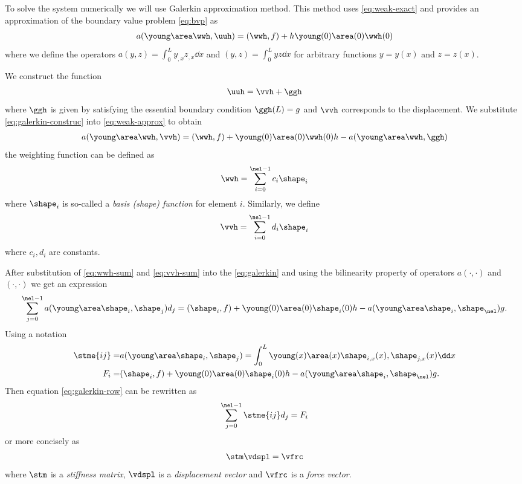 \documentclass[twoside,a4paper,12pt]{article}
\newcommand{\+}[2]{\newcommand#1{{\color{\notcolor}#2}}}
\newcommand{\1}[2]{\newcommand{#1}[1]{{\color{\notcolor}#2}}}
\newcommand{\2}[2]{\newcommand{#1}[2]{{\color{\notcolor}#2}}}
\begin{document}
To solve the system numerically we will use Galerkin approximation
method. This method uses \eqref{eq:weak-exact} and provides an
approximation of the boundary value problem \eqref{eq:bvp} as
%
\begin{align}
a(\young\area\wwh,\uuh) = (\wwh,f) + h \young(0)\area(0)\wwh(0) \label{eq:weak-approx}
\end{align}
%
where we define the operators $a(y,z) = \int_0^L y_{,x} z_{,x} \dd x$
and $(y,z) = \int_0^L y z \dd x$ for arbitrary functions $y = y(x)$
and $z= z(x)$.

We construct the function
\begin{align}
  \uuh  = \vvh + \ggh \label{eq:galerkin-construc}
\end{align}
%
where $\ggh$ is given by satisfying the essential boundary condition
$\ggh(L) = g$ and $\vvh$ corresponds to the displacement. We
substitute \eqref{eq:galerkin-construc} into \eqref{eq:weak-approx} to
obtain
%
\begin{align}
  a(\young\area\wwh,\vvh) = (\wwh, f) + \young(0)\area(0)\wwh(0)h - 
  a(\young\area\wwh,\ggh)\label{eq:galerkin}
\end{align}
%
the weighting function can be defined as
%
\begin{align}
  \wwh = \sum_{i=0}^{\nel-1} c_i \shape_i \label{eq:wwh-sum}
\end{align}
%
where $\shape_i$ is so-called a \emph{basis (shape) function} for
element $i$. Similarly, we define
%
\begin{align}
  \vvh = \sum_{i=0}^{\nel-1} d_i \shape_i \label{eq:vvh-sum}
\end{align}
where $c_i, d_i$ are constants.

After substitution of \eqref{eq:wwh-sum} and \eqref{eq:vvh-sum} into
the \eqref{eq:galerkin} and using the bilinearity property of
operators $a(\cdot,\cdot)$ and $(\cdot,\cdot)$ we get an expression
%
\begin{align}
  \sum_{j=0}^{\nel-1} a(\young\area\shape_i, \shape_j) d_j = (\shape_i, f) + \young(0)\area(0)\shape_i(0) h - a(\young\area\shape_i,\shape_\nel)g. \label{eq:galerkin-row}
\end{align}
%
Using a notation
%
\begin{subequations}
  \begin{align}
    \stme{ij} =& a(\young\area\shape_i,\shape_j) = \int_0^L \young(x)\area(x)\shape_{i,x}(x),\shape_{j,x}(x) \dd x \label{eq:stme} \\ 
    F_i =& (\shape_i,f) + \young(0)\area(0)\shape_i(0) h - a(\young\area\shape_i,\shape_{\nel}) g .
  \end{align}\label{eq:fem-stme-fi}
\end{subequations}
%
Then equation \eqref{eq:galerkin-row} can be rewritten as
%
\begin{align}
  \sum_{j=0}^{\nel-1} \stme{ij} d_j = F_i
\end{align}
or more concisely as
\begin{align}
\stm \vdspl = \vfrc \label{eq:concise-eq}
\end{align}
where $\stm$ is a \emph{stiffness matrix}, $\vdspl$ is a
\emph{displacement vector} and $\vfrc$ is a \emph{force vector}.
\end{document}
